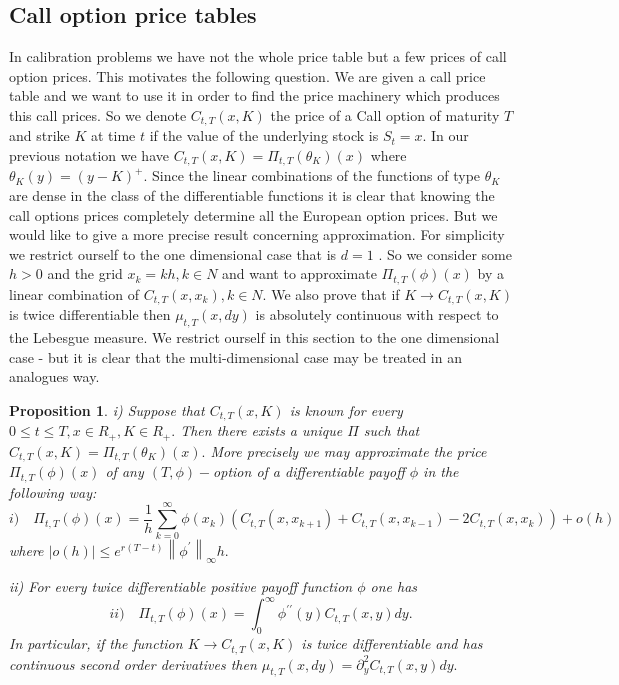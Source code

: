\documentclass[a4paper]{article}
\newtheorem{proposition}{Proposition}[section]
\begin{document}
\subsection{Call option price tables}

In calibration problems we have not the whole price table but a few prices
of call option prices. This motivates the following question. We are given a
call price table and we want to use it in order to find the price machinery
which produces this call prices. So we denote $C_{t,T}(x,K)$ the price of a
Call option of maturity $T$ and strike $K$ at time $t$ if the value of the
underlying stock is $S_{t}=x.$ In our previous notation we have $%
C_{t,T}(x,K)=\Pi _{t,T}(\theta _{K})(x)$ where $\theta _{K}(y)=(y-K)^{+}.$
Since the linear combinations of the functions of type $\theta _{K}$ are
dense in the class of the differentiable functions it is clear that knowing
the call options prices completely determine all the European option prices.
But we would like to give a more precise result concerning approximation.
For simplicity we restrict ourself to the one dimensional case that is $d=1$%
. So we consider some $h>0$ and the grid $x_{k}=kh,k\in N$ and want to
approximate $\Pi _{t,T}(\phi )(x)$ by a linear combination of $%
C_{t,T}(x,x_{k}),k\in N.$ We also prove that if $K\rightarrow C_{t,T}(x,K)$
is twice differentiable then $\mu _{t,T}(x,dy)$ is absolutely continuous
with respect to the Lebesgue measure. We restrict ourself in this section
to the one dimensional case - but it is clear that the multi-dimensional
case may be treated in an analogues way.

\begin{proposition}
i) Suppose that $C_{t,T}(x,K)$ is known for every $0\leq t\leq T,x\in
R_{+},K\in R_{+}.$ Then there exists a unique $\Pi $ such that $%
C_{t,T}(x,K)=\Pi _{t,T}(\theta _{K})(x).$ More precisely we may approximate
the price $\Pi _{t,T}(\phi )(x)$ of any $(T,\phi )-$option of a
differentiable payoff $\phi $ in the following way:
\[
i)\quad \Pi _{t,T}(\phi )(x)=\frac{1}{h}\sum_{k=0}^{\infty }\phi
(x_{k})(C_{t,T}(x,x_{k+1})+C_{t,T}(x,x_{k-1})-2C_{t,T}(x,x_{k}))+o(h)
\]
where $\left| o(h)\right| \leq e^{r(T-t)}\left\| \phi ^{\prime }\right\|
_{\infty }h.$

ii) For every twice differentiable positive payoff function $\phi $ one has
\[
ii)\quad \Pi _{t,T}(\phi )(x)=\int_{0}^{\infty }\phi ^{\prime \prime
}(y)C_{t,T}(x,y)dy.
\]
In particular, if the function $K\rightarrow C_{t,T}(x,K)$ is twice
differentiable and has continuous second order derivatives then $\mu
_{t,T}(x,dy)=\partial _{y}^{2}C_{t,T}(x,y)dy.$
\end{proposition}
\end{document}
